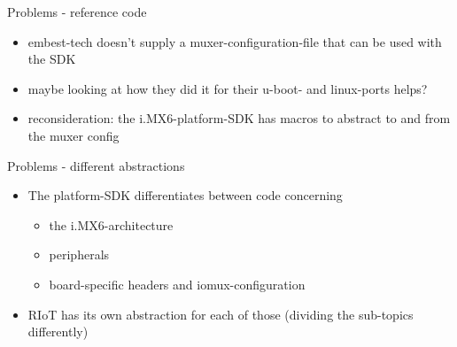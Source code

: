 \documentclass[9pt]{beamer}
\begin{document}
\begin{frame}{Problems - reference code}
 \begin{itemize}
\pause
 \item embest-tech doesn't supply a muxer-configuration-file that can be used with the SDK
\pause
 \item maybe looking at how they did it for their u-boot- and linux-ports helps?
\pause
 \item reconsideration: the i.MX6-platform-SDK has macros to abstract to and from the muxer config
 \end{itemize}
\end{frame}

\begin{frame}{Problems - different abstractions}
 \begin{itemize}
\pause
 \item The platform-SDK differentiates between code concerning
\pause
 	\begin{itemize}
 	\item the i.MX6-architecture
\pause
 	\item peripherals
\pause
 	\item board-specific headers and iomux-configuration
\pause
 	\end{itemize}
 \item RIoT has its own abstraction for each of those (dividing the sub-topics differently)
 \end{itemize}
\end{frame}
\end{document}

